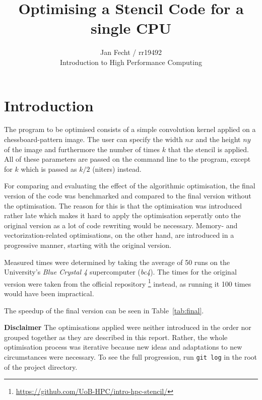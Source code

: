 \documentclass[letterpaper,twocolumn,10pt]{article}
\begin{document}

\date{} %

\title{Optimising a Stencil Code for a single CPU}

\author{
  {\rm Jan Fecht / rr19492}\\
  Introduction to High Performance Computing}

\maketitle


\section*{Introduction}
The program to be optimised consists of a simple convolution kernel applied on a chessboard-pattern image.
The user can specify the width $nx$ and the height $ny$ of the image and furthermore
the number of times $k$ that the stencil is applied. All of these parameters are passed on the command line to the program, except for $k$ which is passed as $k/2$ (niters) instead.

For comparing and evaluating the effect of
the algorithmic optimisation, the final version of the code was benchmarked
and compared to the final version without the optimisation. The reason for this is
that the optimisation was introduced rather late which makes it hard
to apply the optimisation seperatly onto the original version as a lot of code rewriting
would be necessary.
Memory- and vectorization-related optimisations, on the other hand, are introduced in a
progressive manner, starting with the original version.

Measured times were determined by taking the average of 50 runs
on the University's \textit{Blue Crystal 4} supercomputer (\textit{bc4}). The times for
the original version were taken from the official repository
\footnote{\url{https://github.com/UoB-HPC/intro-hpc-stencil/}} instead, as running it 100 times would have been impractical.

The speedup of the final version can be seen in Table~\ref{tab:final}.

\vspace{0.10in}

\textbf{Disclaimer} The optimisations applied were neither introduced
in the order nor grouped together as they are described in this report. Rather, the 
whole optimisation process was iterative because new ideas and adaptations to new
circumstances were necessary. To see the full progression, run \texttt{git log} in the root
of the project directory.
\end{document}
